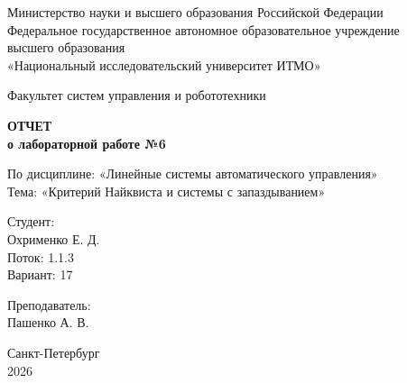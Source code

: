 \documentclass[a4paper,12pt]{article}
\begin{document}
	
	\begin{titlepage}
		\centering
		\vspace*{1cm}
		
		{\small
			Министерство науки и высшего образования Российской Федерации\\
			Федеральное государственное автономное образовательное учреждение\\
			высшего образования\\
			«Национальный исследовательский университет ИТМО»\\
		}
		
		\vspace{2cm}
		
		{\large
			Факультет систем управления и робототехники\\
		}
		
		\vspace{3cm}
		
		{\Huge\bfseries
			ОТЧЕТ\\
		}
		\vspace{0.5cm}
		{\LARGE\bfseries
			о лабораторной работе №6\\
		}
		
		\vspace{1cm}
		
		{\Large
			По дисциплине: «Линейные системы автоматического управления»\\
			\vspace{0.5cm}
			Тема: «Критерий Найквиста и системы с запаздыванием»\\
		}
		
		\vspace{3cm}
		
		\begin{minipage}{0.4\textwidth}
			\raggedright
			{\large
				Студент:\\
			}
			Охрименко Е. Д.\\
			Поток: 1.1.3\\
			Вариант: 17\\
		\end{minipage}
		\hfill
		\begin{minipage}{0.4\textwidth}
			\raggedleft
			{\large
				Преподаватель:\\
			}
			Пашенко А. В.\\
		\end{minipage}
		
		\vfill
		
		{\large
			Санкт-Петербург\\
			2026\\
		}
		
	\end{titlepage}
	
\end{document}
